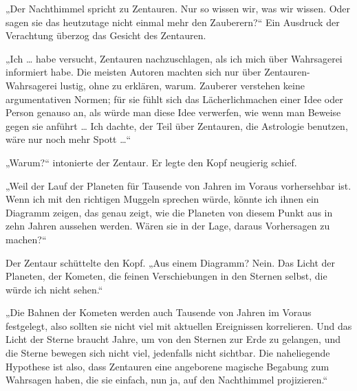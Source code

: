 „Der Nachthimmel spricht zu Zentauren. Nur so wissen wir, was wir wissen. Oder sagen sie das heutzutage nicht einmal mehr den Zauberern?“
Ein Ausdruck der Verachtung überzog das Gesicht des Zentauren.

„Ich … habe versucht, Zentauren nachzuschlagen, als ich mich über Wahrsagerei informiert habe. Die meisten Autoren machten sich nur über Zentauren-Wahrsagerei lustig, ohne zu erklären, warum. Zauberer verstehen keine argumentativen Normen; für sie fühlt sich das Lächerlichmachen einer Idee oder Person genauso an, als würde man diese Idee verwerfen, wie wenn man Beweise gegen sie anführt … Ich dachte, der Teil über Zentauren, die Astrologie benutzen, wäre nur noch mehr Spott …“

„Warum?“ intonierte der Zentaur. Er legte den Kopf neugierig schief.

„Weil der Lauf der Planeten für Tausende von Jahren im Voraus vorhersehbar ist. Wenn ich mit den richtigen Muggeln sprechen würde, könnte ich ihnen ein Diagramm zeigen, das genau zeigt, wie die Planeten von diesem Punkt aus in zehn Jahren aussehen werden. Wären sie in der Lage, daraus Vorhersagen zu machen?“

Der Zentaur schüttelte den Kopf.
„Aus einem Diagramm? Nein. Das Licht der Planeten, der Kometen, die feinen Verschiebungen in den Sternen selbst, die würde ich nicht sehen.“

„Die Bahnen der Kometen werden auch Tausende von Jahren im Voraus festgelegt, also sollten sie nicht viel mit aktuellen Ereignissen korrelieren. Und das Licht der Sterne braucht Jahre, um von den Sternen zur Erde zu gelangen, und die Sterne bewegen sich nicht viel, jedenfalls nicht sichtbar. Die naheliegende Hypothese ist also, dass Zentauren eine angeborene magische Begabung zum Wahrsagen haben, die sie einfach, nun ja, auf den Nachthimmel projizieren.“

